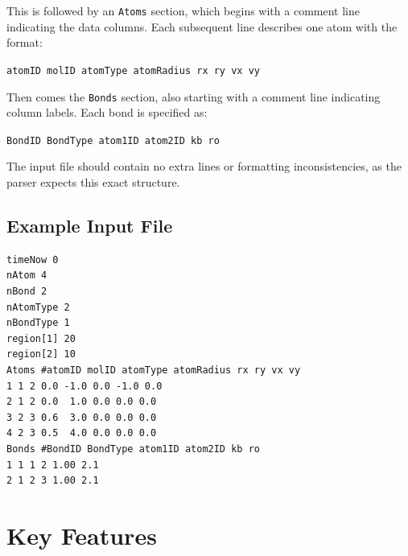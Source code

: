 \documentclass[a4paper,10pt]{article}
\begin{document}
This is followed by an \texttt{Atoms} section, which begins with a comment line indicating the data columns. Each 
subsequent line describes one atom with the format:
\begin{center}
\texttt{atomID molID atomType atomRadius rx ry vx vy}
\end{center}

Then comes the \texttt{Bonds} section, also starting with a comment line indicating column labels. Each bond is 
specified as:
\begin{center}
\texttt{BondID BondType atom1ID atom2ID kb ro}
\end{center}

\noindent The input file should contain no extra lines or formatting inconsistencies, as the parser expects this exact 
structure.

\subsection*{Example Input File}

\begin{verbatim}
timeNow 0
nAtom 4
nBond 2
nAtomType 2
nBondType 1
region[1] 20
region[2] 10
Atoms #atomID molID atomType atomRadius rx ry vx vy 
1 1 2 0.0 -1.0 0.0 -1.0 0.0
2 1 2 0.0  1.0 0.0 0.0 0.0
3 2 3 0.6  3.0 0.0 0.0 0.0
4 2 3 0.5  4.0 0.0 0.0 0.0
Bonds #BondID BondType atom1ID atom2ID kb ro
1 1 1 2 1.00 2.1
2 1 2 3 1.00 2.1
\end{verbatim}
\section*{Key Features}
\end{document}
